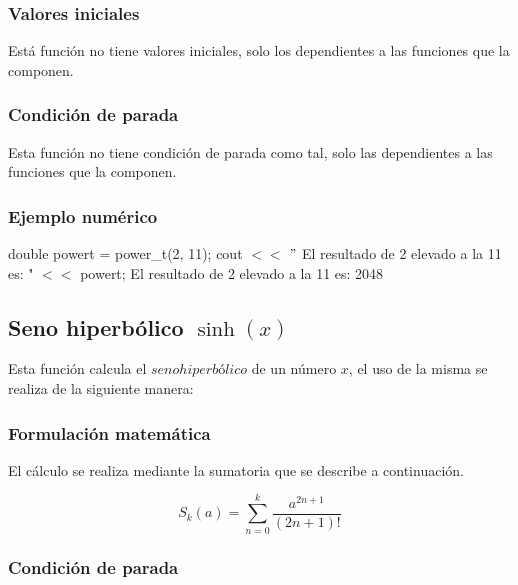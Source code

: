 \documentclass[10pt,a4paper]{article}
\begin{document}
	\subsubsection{Valores iniciales}
	
	Está función no tiene valores iniciales, solo los dependientes a las funciones que la componen.		

	\subsubsection{Condición de parada}

	Esta función no tiene condición de parada como tal, solo las dependientes a las funciones que la componen.
	
	\subsubsection{Ejemplo numérico}

	double powert = power{\_}t(2, 11); \newline
	cout $<<$ $"$ El resultado de 2 elevado a la 11 es: " $<<$ powert; \newline
	El resultado de 2 elevado a la 11 es: 2048\newline
	
	\subsection{Seno hiperbólico $\sinh(x)$}
	
	Esta función calcula el $seno hiperbólico$ de un número $x$, el uso de la misma se realiza de la siguiente manera:
	
	\begin{center}
	\end{center}
	
	\subsubsection{Formulación matemática}
	
	El cálculo se realiza mediante la sumatoria que se describe a continuación.
	
	\begin{equation}\label{key14}
		S_{k}(a) = \sum_{n=0}^{k}\frac{a^{2n + 1}}{(2n + 1)!}
	\end{equation}
	
	\subsubsection{Condición de parada}
	
\end{document}
